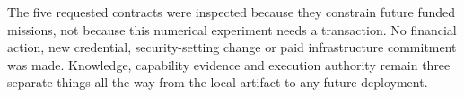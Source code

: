 \documentclass[11pt,a4paper]{article}
\begin{document}
The five requested contracts were inspected because they constrain future funded missions, not because this numerical experiment needs a transaction. No financial action, new credential, security-setting change or paid infrastructure commitment was made. Knowledge, capability evidence and execution authority remain three separate things all the way from the local artifact to any future deployment.
\end{document}
